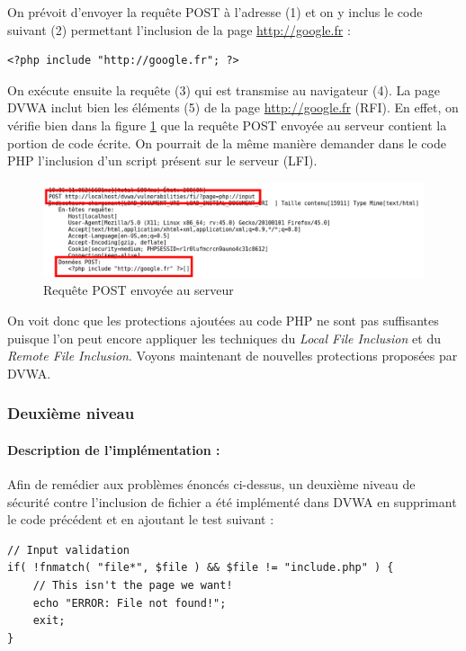 On prévoit d'envoyer la requête POST à l'adresse  (1) et on y inclus le code suivant (2) permettant l'inclusion de la page \url{http://google.fr} :
\begin{lstlisting}
<?php include "http://google.fr"; ?>
\end{lstlisting}
On exécute ensuite la requête (3) qui est transmise au navigateur (4). La page DVWA inclut bien les éléments (5) de la page \url{http://google.fr} (RFI). En effet, on vérifie bien dans la figure \ref{fi_dvwa7} que la requête POST envoyée au serveur contient la portion de code écrite. On pourrait de la même manière demander dans le code PHP l'inclusion d'un script présent sur le serveur (LFI).

\begin{figure}[!h]
\begin{center}
\includegraphics[scale=.45]{images/fi7.png}

\caption{Requête POST envoyée au serveur}
\label{fi_dvwa7}
\end{center}
\end{figure}

On voit donc que les protections ajoutées au code PHP ne sont pas suffisantes puisque l'on peut encore appliquer les techniques du \textit{Local File Inclusion} et du \textit{Remote File Inclusion}. Voyons maintenant de nouvelles protections proposées par DVWA.

\subsubsection{Deuxième niveau}

\paragraph{Description de l'implémentation :}


Afin de remédier aux problèmes énoncés ci-dessus, un deuxième niveau de sécurité contre l'inclusion de fichier a été implémenté dans DVWA en supprimant le code précédent et en ajoutant le test  suivant :
\begin{lstlisting}
// Input validation
if( !fnmatch( "file*", $file ) && $file != "include.php" ) {
    // This isn't the page we want!
    echo "ERROR: File not found!";
    exit;
} 
\end{lstlisting}

